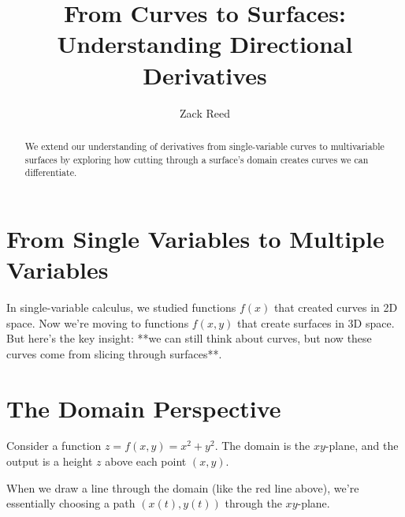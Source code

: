 \documentclass{ximera}
\title{From Curves to Surfaces: Understanding Directional Derivatives}
\author{Zack Reed}
\begin{document}
\begin{abstract}
We extend our understanding of derivatives from single-variable curves to multivariable surfaces by exploring how cutting through a surface's domain creates curves we can differentiate.
\end{abstract}
\maketitle

\section*{From Single Variables to Multiple Variables}

In single-variable calculus, we studied functions $f(x)$ that created curves in 2D space. Now we're moving to functions $f(x,y)$ that create surfaces in 3D space. But here's the key insight: **we can still think about curves, but now these curves come from slicing through surfaces**.

\section*{The Domain Perspective}

Consider a function $z = f(x,y) = x^2 + y^2$. The domain is the $xy$-plane, and the output is a height $z$ above each point $(x,y)$.


When we draw a line through the domain (like the red line above), we're essentially choosing a path $(x(t), y(t))$ through the $xy$-plane.
\end{document}
